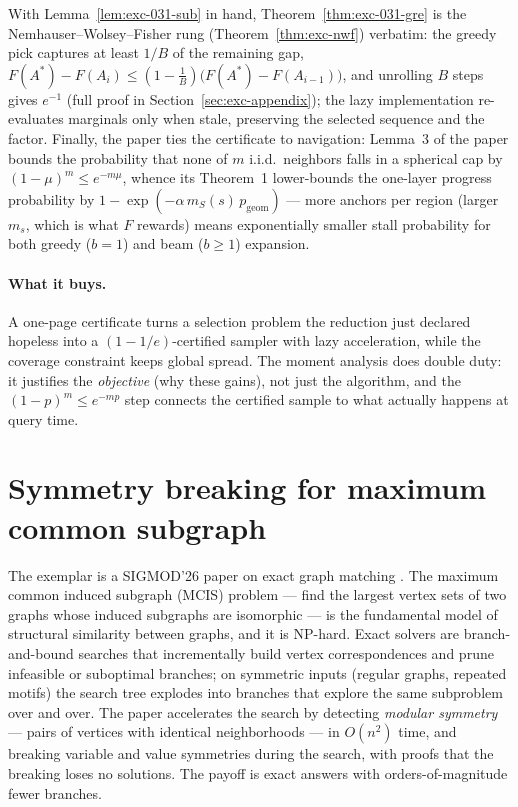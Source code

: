 With Lemma~\ref{lem:exc-031-sub} in hand, Theorem~\ref{thm:exc-031-gre} is the
Nemhauser--Wolsey--Fisher rung (Theorem~\ref{thm:exc-nwf}) verbatim: the greedy pick
captures at least $1/B$ of the remaining gap,
$F(A^{*}) - F(A_i) \le (1-\tfrac1B)\bigl(F(A^{*})-F(A_{i-1})\bigr)$, and unrolling $B$
steps gives $e^{-1}$ (full proof in Section~\ref{sec:exc-appendix}); the lazy
implementation re-evaluates marginals only when stale, preserving the selected
sequence and the factor. Finally, the paper ties the certificate to navigation:
Lemma~3 of the paper bounds the probability that none of $m$ i.i.d.\ neighbors falls
in a spherical cap by $(1-\mu)^{m}\le e^{-m\mu}$, whence its Theorem~1 lower-bounds
the one-layer progress probability by $1-\exp(-\alpha\, m_S(s)\, p_{\mathrm{geom}})$
--- more anchors per region (larger $m_s$, which is what $F$ rewards) means
exponentially smaller stall probability for both greedy ($b=1$) and beam ($b\ge 1$)
expansion.

\paragraph{What it buys.}
A one-page certificate turns a selection problem the reduction just declared hopeless
into a $(1-1/e)$-certified sampler with lazy acceleration, while the coverage
constraint keeps global spread. The moment analysis does double duty: it justifies
the \emph{objective} (why these gains), not just the algorithm, and the
$(1-p)^{m}\le e^{-mp}$ step connects the certified sample to what actually happens at
query time.

\section{Symmetry breaking for maximum common subgraph}
\label{sec:exc-009}

The exemplar is a SIGMOD'26 paper on exact graph matching \citep{sigmod26-009}. The
maximum common induced subgraph (MCIS) problem --- find the largest vertex sets of two
graphs whose induced subgraphs are isomorphic --- is the fundamental model of
structural similarity between graphs, and it is NP-hard. Exact solvers are
branch-and-bound searches that incrementally build vertex correspondences and prune
infeasible or suboptimal branches; on symmetric inputs (regular graphs, repeated
motifs) the search tree explodes into branches that explore the same subproblem over
and over. The paper accelerates the search by detecting \emph{modular symmetry} ---
pairs of vertices with identical neighborhoods --- in $O(n^{2})$ time, and breaking
variable and value symmetries during the search, with proofs that the breaking loses
no solutions. The payoff is exact answers with orders-of-magnitude fewer branches.

